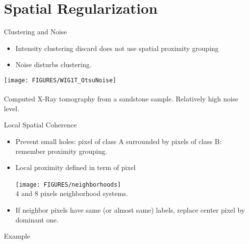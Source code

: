 \documentclass[9pt]{beamer}
\newcommand{\myemph}[1]{{\color{blue}{#1}}}
\begin{document}
\section{Spatial Regularization}


\begin{frame}[t]{Clustering and Noise}
  \begin{itemize}
  \item Intensity clustering discard does not use spatial proximity grouping
  \item Noise disturbs clustering.
  \end{itemize}
  \begin{center}
    \texttt{[image: FIGURES/WIG1T\_OtsuNoise]}\\
    ~\\
    Computed X-Ray tomography from a sandstone sample. Relatively high noise level.
  \end{center}
\end{frame}


\begin{frame}[t]{Local Spatial Coherence}
  \begin{itemize}
  \item Prevent small holes: pixel of class A surrounded by pixels of class B: remember proximity grouping.\vfill
  \item Local proximity defined in term of pixel \myemph{neighborhoods}\vfill
    \begin{center}
      \texttt{[image: FIGURES/neighborhoods]}~\\
      4 and 8 pixels neighborhood systems.
    \end{center}\vfill
  \item If neighbor pixels have same (or almost same) labels, replace center pixel by dominant one.
  \end{itemize}
\end{frame}



\begin{frame}[t]{Example}
  \vfill
  \begin{center}
  \end{center}\vfill
\end{frame}
\end{document}
